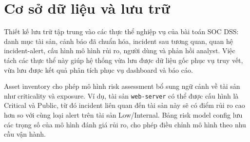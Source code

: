 \documentclass[a4paper,12pt,oneside]{book}
\begin{document}
\section{Cơ sở dữ liệu và lưu trữ}
{\fontsize{13pt}{15.6pt}\selectfont

Thiết kế lưu trữ tập trung vào các thực thể nghiệp vụ của bài toán SOC DSS: danh mục tài sản, cảnh báo đã chuẩn hóa, incident sau tương quan, quan hệ incident-alert, cấu hình mô hình rủi ro, người dùng và phản hồi analyst. Việc tách các thực thể này giúp hệ thống vừa lưu được dữ liệu gốc phục vụ truy vết, vừa lưu được kết quả phân tích phục vụ dashboard và báo cáo.

\noindent Asset inventory cho phép mô hình risk assessment bổ sung ngữ cảnh về tài sản như criticality và exposure. Ví dụ, tài sản \texttt{web-server} có thể được cấu hình là Critical và Public, từ đó incident liên quan đến tài sản này sẽ có điểm rủi ro cao hơn so với cùng loại alert trên tài sản Low/Internal. Bảng risk model config lưu các trọng số của mô hình đánh giá rủi ro, cho phép điều chỉnh mô hình theo nhu cầu vận hành.

\begin{figure}[H]
\centering
{}
\end{figure}}
\end{document}
